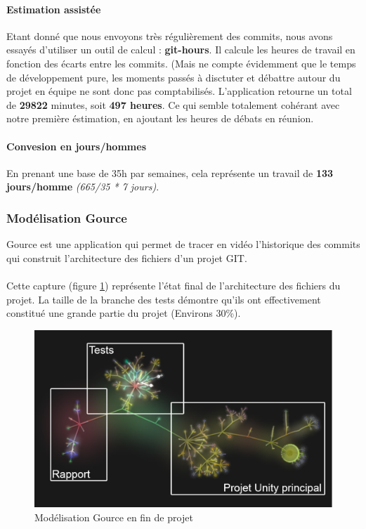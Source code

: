 \paragraph{Estimation assistée}
Etant donné que nous envoyons très régulièrement des commits, nous avons essayés d'utiliser un outil de calcul :  \textbf{git-hours}. Il calcule les heures de travail en fonction des écarts entre les commits. (Mais ne compte évidemment que le temps de développement pure, les moments passés à disctuter et débattre autour du projet en équipe ne sont donc pas comptabilisés. L'application retourne un total de \textbf{29822} minutes, soit \textbf{497 heures}. Ce qui semble totalement cohérant avec notre première éstimation, en ajoutant les heures de débats en réunion.

\paragraph{Convesion en jours/hommes}
En prenant une base de 35h par semaines, cela représente un travail de \textbf{133 jours/homme} \textit{(665/35 * 7 jours)}.

\subsubsection{Modélisation Gource}

Gource est une application qui permet de tracer en vidéo l’historique des commits qui construit l’architecture des fichiers d’un projet GIT.

\paragraph{}
Cette capture (figure \ref{gource_over}) représente l’état final de l’architecture des fichiers du projet. La taille de la branche des tests démontre qu'ils ont effectivement constitué une grande partie du projet (Environs 30\%).

\begin{figure}[H]\centering
  \includegraphics[scale=.3]{./img/gource_over.png}
  \caption{Modélisation Gource en fin de projet}
  \label{gource_over}
\end{figure}


